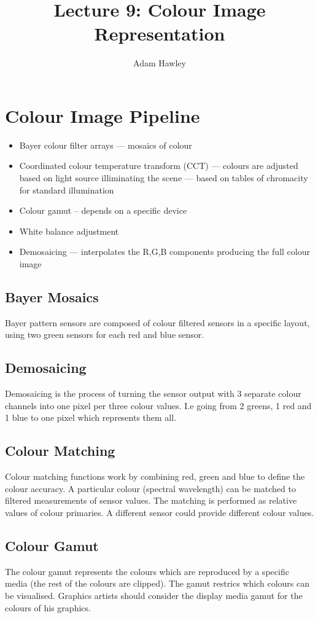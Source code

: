 \documentclass{article}
\title{Lecture 9: Colour Image Representation}
\author{Adam Hawley}
\begin{document}
\maketitle
\tableofcontents
\newpage

\section{Colour Image Pipeline}
\begin{itemize}
	\item Bayer colour filter arrays --- mosaics of colour
	\item Coordinated colour temperature transform (CCT) --- colours are adjusted based on light source illiminating the scene --- based on tables of chromacity for standard illumination
	\item Colour gamut -- depends on a specific device
	\item White balance adjustment
	\item Demosaicing --- interpolates the R,G,B components producing the full colour image
\end{itemize}

\subsection{Bayer Mosaics}
Bayer pattern sensors are composed of colour filtered sensors in a specific layout, using two green sensors for each red and blue sensor.

\subsection{Demosaicing}
Demosaicing is the process of turning the sensor output with 3 separate colour channels into one pixel per three colour values.
I.e going from 2 greens, 1 red and 1 blue to one pixel which represents them all.

\subsection{Colour Matching}
Colour matching functions work by combining red, green and blue to define the colour accuracy.
A particular colour (spectral wavelength) can be matched to filtered measurements of sensor values.
The matching is performed as relative values of colour primaries.
A different sensor could provide different colour values.

\subsection{Colour Gamut}
The colour gamut represents the colours which are reproduced by a specific media (the rest of the colours are clipped).
The gamut restrics which colours can be visualised.
Graphics artists should consider the display media gamut for the colours of his graphics.
\end{document}
